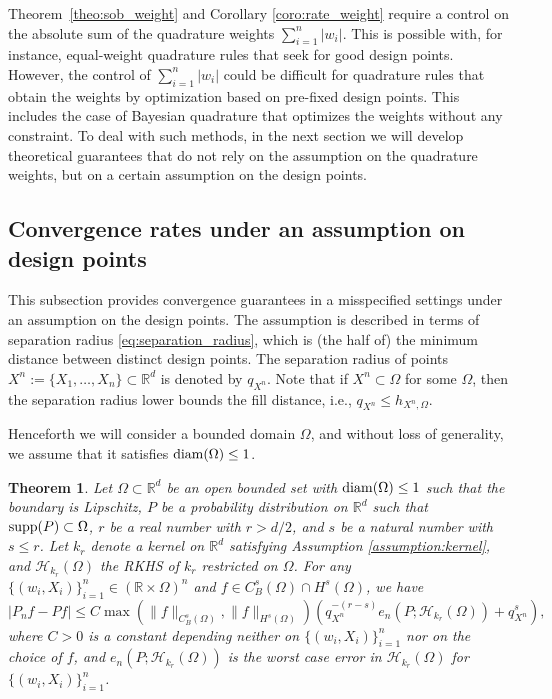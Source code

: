 \documentclass[11pt]{article}
\newtheorem{theorem}{Theorem}
\theoremstyle{remark}
\theoremstyle{example}
\theoremstyle{remark}
\renewcommand{\H}{{\mathcal{H}}}
\newcommand{\R}{\mathbb{R}}
\begin{document}
Theorem~\ref{theo:sob_weight} and Corollary \ref{coro:rate_weight} require a control on the absolute sum of the quadrature weights $\sum_{i=1}^n |w_i|$. 
This is possible with, for instance, equal-weight quadrature rules that seek for good design points.
However, the control of $\sum_{i=1}^n |w_i|$ could be difficult for quadrature rules that obtain the weights by optimization based on pre-fixed design points.
This includes the case of Bayesian quadrature that optimizes the weights without any constraint. 
To deal with such methods, in the next section we will develop theoretical guarantees that do not rely on the assumption on the quadrature weights, but on a certain assumption on the design points.


\subsection{Convergence rates under an assumption on design points}
\label{sec:upper_sep}

This subsection provides convergence guarantees in a misspecified settings under an assumption on the design points.  The assumption is described in terms of separation radius \eqref{eq:separation_radius}, which is (the half of) the minimum distance between distinct design points.  The separation radius of points $X^n := \{ X_1,\dots, X_n \} \subset \R^d$ is denoted by $q_{X^n}$.  
Note that if $X^n\subset \Omega$ for some $\Omega$, then the separation radius lower bounds the fill distance, i.e., $q_{X^n} \leq h_{X^n,\Omega}$.

Henceforth we will consider a bounded domain $\Omega$, and without loss of generality, we assume that it satisfies ${\rm diam}(\Omega) \leq 1$.
\begin{theorem} \label{theo:sob_sepa}
Let $\Omega \subset \R^d$ be an open bounded set with ${\rm diam}(\Omega) \leq 1$ such that the boundary is Lipschitz, $P$ be a probability distribution on $\R^d$ such that ${\rm supp}(P) \subset \Omega$, $r$ be a real number with $r > d/2$, and $s$ be a natural number with $s \leq r$.  Let $k_r$ denote a kernel on $\R^d$ satisfying Assumption \ref{assumption:kernel}, and $\H_{k_r}(\Omega)$ the RKHS of $k_r$ restricted on $\Omega$.
For any $\{ (w_i,X_i) \}_{i=1}^n \in (\R \times \Omega)^n$ and $f \in C_B^s (\Omega) \cap H^s (\Omega)$, we have
\begin{equation}
\left| P_n f - Pf \right| \leq C \max \left(  \| f \|_{C_B^s(\Omega)}, \| f \|_{H^s(\Omega)}  \right)  \left(  q_{X^n}^{- (r-s) } e_n(P; \H_{k_r}(\Omega)) + q_{X^n}^{s} \right), \label{eq:bound_sob_sepa_379}
\end{equation}
where $C > 0$ is a constant depending  neither on $\{ (w_i,X_i) \}_{i=1}^n$ nor on the choice of $f$, and $e_n(P; \H_{k_r}(\Omega))$ is the worst case error in $\H_{k_r}(\Omega)$ for $\{ (w_i, X_i) \}_{i=1}^n$.%
\end{theorem}
\end{document}
